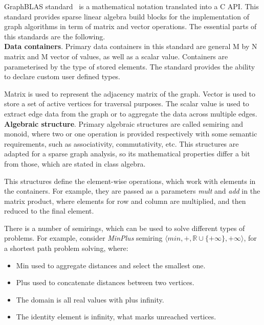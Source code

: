 GraphBLAS standard~\cite{paper:graphblas_foundations} is a mathematical notation translated into a C API. This standard provides sparse linear algebra build blocks for the implementation of graph algorithms in term of matrix and vector operations. The essential parts of this standards are the following.\\

\textbf{Data containers}. Primary data containers in this standard are general M by N matrix and M vector of values, as well as a scalar value. Containers are parameterised by the type of stored elements. The standard provides the ability to declare custom user defined types. 

Matrix is used to represent the adjacency matrix of the graph. Vector is used to store a set of active vertices for traversal purposes. The scalar value is used to extract edge data from the graph or to aggregate the data across multiple edges.\\

\textbf{Algebraic structure}. Primary algebraic structures are called semiring and monoid, where two or one operation is provided respectively with some semantic requirements, such as associativity, commutativity, etc. This structures are adapted for a sparse graph analysis, so its mathematical properties differ a bit from those, which are stated in class algebra.

This structures define the element-wise operations, which work with elements in the containers. For example, they are passed as a parameters \textit{mult} and \textit{add} in the matrix product, where elements for row and column are multiplied, and then reduced to the final element.

There is a number of semirings, which can be used to solve different types of problems. For example, consider \textit{MinPlus} semiring $\langle min, +, \mathbb{R} \cup \{+\infty\}, +\infty \rangle$, for a shortest path problem solving, where:

\begin{itemize}
    \item Min used to aggregate distances and select the smallest one.
    \item Plus used to concatenate distances between two vertices.
    \item The domain is all real values with plus infinity.
    \item The identity element is infinity, what marks unreached vertices.
\end{itemize}

